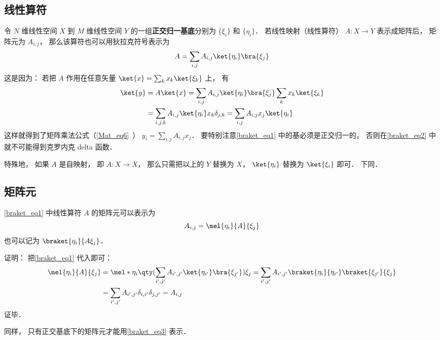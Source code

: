 \subsection{线性算符}
令 $N$ 维线性空间 $X$ 到 $M$ 维线性空间 $Y$ 的一组\textbf{正交归一基底}分别为 $\{\xi_i\}$ 和 $\{\eta_i\}$． 若线性映射（线性算符） $A:X\to Y$ 表示成矩阵后， 矩阵元为 $A_{i,j}$， 那么该算符也可以用狄拉克符号表示为
\begin{equation}\label{braket_eq1}
A = \sum_{i,j} A_{i,j} \ket{\eta_i}\bra{\xi_j}
\end{equation}
这是因为： 若把 $A$ 作用在任意矢量 $\ket{x} = \sum_k x_k\ket{\xi_k}$ 上， 有
\begin{equation}\label{braket_eq2}
\begin{aligned}
\ket{y} &= A\ket{x} = \sum_{i,j} A_{i,j} \ket{\eta_i}\bra{\xi_j} \sum_k x_k\ket{\xi_k}\\
&= \sum_{i,j, k} A_{i,j} \ket{\eta_i} x_k \delta_{j,k}
= \sum_{i,j} A_{i,j} x_j \ket{\eta_i}
\end{aligned}
\end{equation}
这样就得到了矩阵乘法公式（\autoref{Mat_eq6}~） $y_i = \sum_{i,j} A_{i,j} x_j$． 要特别注意\autoref{braket_eq1} 中的基必须是正交归一的， 否则在\autoref{braket_eq2} 中就不可能得到克罗内克 delta 函数．

特殊地， 如果 $A$ 是自映射， 即 $A:X\to X$， 那么只需把以上的 $Y$ 替换为 $X$， $\ket{\eta_i}$ 替换为 $\ket{\xi_i}$ 即可． 下同．

\subsection{矩阵元}
\autoref{braket_eq1} 中线性算符 $A$ 的矩阵元可以表示为
\begin{equation}\label{braket_eq3}
A_{i,j} = \mel{\eta_i}{A}{\xi_j}
\end{equation}
也可以记为 $\braket{\eta_i}{A\xi_j}$．

证明： 把\autoref{braket_eq1} 代入即可：
\begin{equation}
\begin{aligned}
\mel{\eta_i}{A}{\xi_j} &= \mel*{\eta_i}{\qty(\sum_{i',j'} A_{i',j'} \ket{\eta_{i'}}\bra{\xi_{j'}})}{\xi_j}
= \sum_{i',j'} A_{i',j'} \braket{\eta_i}{\eta_{i'}}\braket{\xi_{j'}}{\xi_j}\\
&= \sum_{i',j'} A_{i',j'} \delta_{i,i'}\delta_{j,j'}
= A_{i,j}
\end{aligned}
\end{equation}
证毕．

同样， 只有正交基底下的矩阵元才能用\autoref{braket_eq3} 表示．
